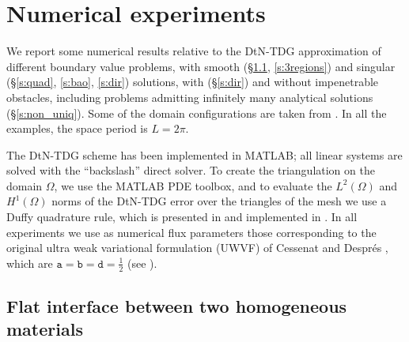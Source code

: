 \documentclass[a4paper,10pt]{article}
\newcommand{\pa}{{\mathtt{a}}}
\newcommand{\pb}{{\mathtt{b}}}
\newcommand{\pd}{{\mathtt{d}}}
\begin{document}
\section{Numerical experiments}\label{s:Numerics}

We report some numerical results relative to the DtN-TDG approximation of different boundary value problems, with smooth (\S\ref{s:2regions}, \ref{s:3regions}) and singular (\S\ref{s:quad}, \ref{s:bao}, \ref{s:dir}) solutions, with (\S\ref{s:dir}) and without impenetrable obstacles, including problems admitting infinitely many analytical solutions (\S\ref{s:non_uniq}).
Some of the domain configurations are taken from  
\cite{Bao2000}.
In all the examples, the space period is $L=2\pi$.

The DtN-TDG scheme has been implemented in MATLAB; all linear systems are solved with the ``backslash'' direct solver.
To create the triangulation on the domain $\Omega$, we use the MATLAB PDE toolbox, and to evaluate the $L^2(\Omega)$ and $H^1(\Omega)$ norms of the DtN-TDG error over the triangles of the mesh we use a Duffy quadrature rule, which is presented in \cite{Duffy1982} and implemented in \cite{Kubatko2024}. 
In all experiments we use as numerical flux parameters those corresponding to the original ultra weak variational formulation (UWVF) of Cessenat and Després \cite{Cessenat1998}, which are $\pa=\pb=\pd=\frac{1}{2}$ (see \cite[\S2.2.2]{Hiptmair2016}).


\subsection{Flat interface between two homogeneous materials}
\label{s:2regions}
\end{document}
